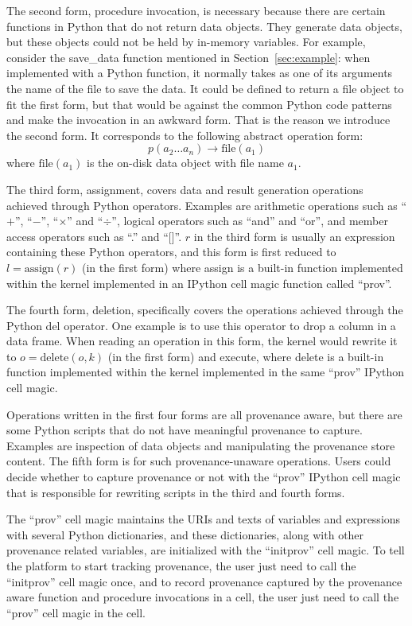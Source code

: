 The second form, procedure invocation, is necessary because there are certain functions in Python that do not return data objects. They generate data objects, but these objects could not be held by in-memory variables. For example, consider the save\_data function mentioned in Section~\ref{sec:example}: when implemented with a Python function, it normally takes as one of its arguments the name of the file to save the data. It could be defined to return a file object to fit the first form, but that would be against the common Python code patterns and make the invocation in an awkward form. That is the reason we introduce the second form. It corresponds to the following abstract operation form:
\begin{equation}
p(a_2\dots a_n)\rightarrow \textrm{file}(a_1)
\end{equation}
where $\textrm{file}(a_1)$ is the on-disk data object with file name $a_1$.

The third form, assignment, covers data and result generation operations achieved through Python operators. Examples are arithmetic operations such as ``$+$'', ``$-$'', ``$\times$'' and ``$\div$'', logical operators such as ``and'' and ``or'', and member access operators such as ``.'' and ``[]''. $r$ in the third form is usually an expression containing these Python operators, and this form is first reduced to $l = \textrm{assign}(r)$ (in the first form) where assign is a built-in function implemented within the kernel implemented in an IPython cell magic function called ``prov''.

The fourth form, deletion, specifically covers the operations achieved through the Python del operator. One example is to use this operator to drop a column in a data frame. When reading an operation in this form, the kernel would rewrite it to $o = \textrm{delete}(o, k)$ (in the first form) and execute, where delete is a built-in function implemented within the kernel implemented in the same ``prov'' IPython cell magic.

Operations written in the first four forms are all provenance aware, but there are some Python scripts that do not have meaningful provenance to capture. Examples are inspection of data objects and manipulating the provenance store content. The fifth form is for such provenance-unaware operations. Users could decide whether to capture provenance or not with the ``prov'' IPython cell magic that is responsible for rewriting scripts in the third and fourth forms.

The ``prov'' cell magic maintains the URIs and texts of variables and expressions with several Python dictionaries, and these dictionaries, along with other provenance related variables, are initialized with the ``initprov'' cell magic. To tell the platform to start tracking provenance, the user just need to call the ``initprov'' cell magic once, and to record provenance captured by the provenance aware function and procedure invocations in a cell, the user just need to call the ``prov'' cell magic in the cell.

